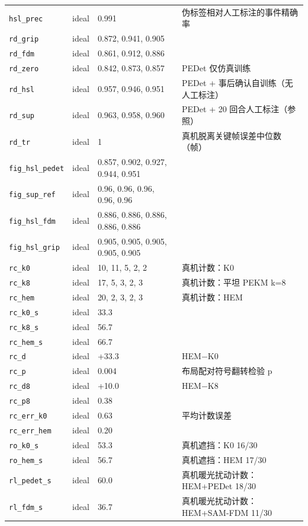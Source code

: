 \begin{longtable}{p{3.2cm}p{0.9cm}p{4.2cm}p{6.2cm}}
\texttt{hsl\_prec} & ideal & 0.991 & 伪标签相对人工标注的事件精确率\\
\texttt{rd\_grip} & ideal & 0.872, 0.941, 0.905 & \\
\texttt{rd\_fdm} & ideal & 0.861, 0.912, 0.886 & \\
\texttt{rd\_zero} & ideal & 0.842, 0.873, 0.857 & PEDet 仅仿真训练\\
\texttt{rd\_hsl} & ideal & 0.957, 0.946, 0.951 & PEDet + 事后确认自训练（无人工标注）\\
\texttt{rd\_sup} & ideal & 0.963, 0.958, 0.960 & PEDet + 20 回合人工标注（参照）\\
\texttt{rd\_tr} & ideal & 1 & 真机脱离关键帧误差中位数（帧）\\
\texttt{fig\_hsl\_pedet} & ideal & 0.857, 0.902, 0.927, 0.944, 0.951 & \\
\texttt{fig\_sup\_ref} & ideal & 0.96, 0.96, 0.96, 0.96, 0.96 & \\
\texttt{fig\_hsl\_fdm} & ideal & 0.886, 0.886, 0.886, 0.886, 0.886 & \\
\texttt{fig\_hsl\_grip} & ideal & 0.905, 0.905, 0.905, 0.905, 0.905 & \\
\texttt{rc\_k0} & ideal & 10, 11, 5, 2, 2 & 真机计数：K0\\
\texttt{rc\_k8} & ideal & 17, 5, 3, 2, 3 & 真机计数：平坦 PEKM k=8\\
\texttt{rc\_hem} & ideal & 20, 2, 3, 2, 3 & 真机计数：HEM\\
\texttt{rc\_k0\_s} & ideal & 33.3 & \\
\texttt{rc\_k8\_s} & ideal & 56.7 & \\
\texttt{rc\_hem\_s} & ideal & 66.7 & \\
\texttt{rc\_d} & ideal & +33.3 & HEM−K0\\
\texttt{rc\_p} & ideal & 0.004 & 布局配对符号翻转检验 p\\
\texttt{rc\_d8} & ideal & +10.0 & HEM−K8\\
\texttt{rc\_p8} & ideal & 0.38 & \\
\texttt{rc\_err\_k0} & ideal & 0.63 & 平均计数误差\\
\texttt{rc\_err\_hem} & ideal & 0.20 & \\
\texttt{ro\_k0\_s} & ideal & 53.3 & 真机遮挡：K0 16/30\\
\texttt{ro\_hem\_s} & ideal & 56.7 & 真机遮挡：HEM 17/30\\
\texttt{rl\_pedet\_s} & ideal & 60.0 & 真机暖光扰动计数：HEM+PEDet 18/30\\
\texttt{rl\_fdm\_s} & ideal & 36.7 & 真机暖光扰动计数：HEM+SAM-FDM 11/30\\

\end{longtable}
